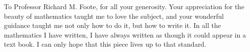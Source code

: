 To Professor Richard M. Foote, for all your generosity.
Your appreciation for the beauty of mathematics taught me to love the subject, and your wonderful guidance taught me not only how to do it, but how to write it.
In all the mathematics I have written, I have always written as though it could appear in a text book.
I can only hope that this piece lives up to that standard.
